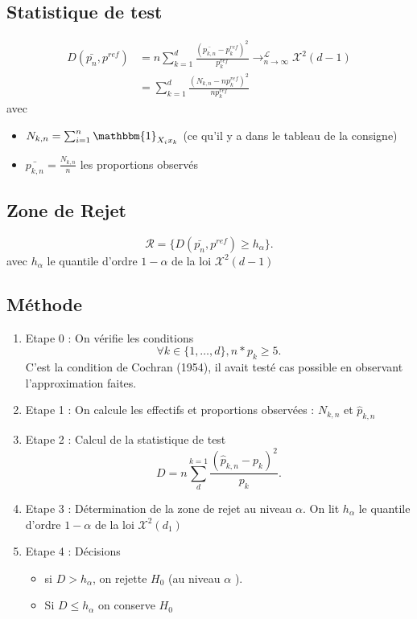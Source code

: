 \documentclass{article}
\theoremstyle{plain}%
\theoremstyle{definition}
\theoremstyle{remark}
\begin{document}
\subsection*{Statistique de test}
\begin{align*}
    D(\bar{p_n}, p^{ref}) &= n \sum_{k=1}^{d}\frac{(\bar{p_{k,n}} - p_k^{ref})^2}{p_k^{ref}} \to ^{\mathcal{L}}_{n \to \infty } \mathcal{X}^2(d-1) \\
        &= \sum_{k=1}^{d} \frac{(N_{k,n} - np_k^{ref})^2}{n p_k^{ref}}
\end{align*}
avec \begin{itemize}
    \item $ N_{k,n} = \sum_{i=1}^{n}\mathbbm{1}_{X_i x_k} $ (ce qu'il y a dans le tableau de la consigne)
    \item $ \bar{p_{k,n}} = \frac{N_{k,n}}{n} $ les proportions observés
\end{itemize}

\subsection*{Zone de Rejet}
\[
    \mathcal{R} = \{D(\bar{p_n}, p^{ref}) \geq h_\alpha\}
.\]
avec $ h_\alpha  $ le quantile d'ordre $ 1-\alpha  $ de la loi $ \mathcal{X}^2(d-1) $

\subsection*{Méthode}
\begin{enumerate}
    \item Etape 0 : On vérifie les conditions 
    \[
        \forall k \in \{1, \dots, d\}, n*p_k \geq 5
    .\]
    C'est la condition de Cochran (1954), il avait testé cas possible en observant l'approximation faites.
    \item Etape 1 : On calcule les effectifs et proportions observées : $ N_{k,n} $ et $ \hat{p}_{k,n} $  
    \item Etape 2 : Calcul de la statistique de test 
    \[
        D = n \sum_{d}^{k=1} \frac{(\hat{p}_{k,n} - p_k)^2}{p_k}
    .\]
    \item Etape 3 : Détermination de la zone de rejet au niveau $ \alpha  $. On lit $ h_\alpha  $ le quantile d'ordre $ 1-\alpha  $ de la loi $ \mathcal{X}^2(d_1) $ 
    \item Etape 4 : Décisions \begin{itemize}
        \item si $ D > h_\alpha  $, on rejette $ H_0 $ (au niveau $ \alpha  $ ). 
        \item Si $ D \leq h_\alpha  $ on conserve $ H_0 $ 
    \end{itemize}
\end{enumerate}
\end{document}
